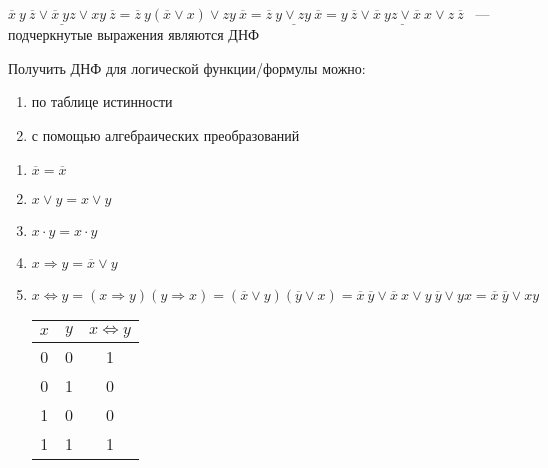 \documentclass[russian]{lecture-notes}
\begin{document}
\begin{sloppypar}
        \begin{example}
            $\underline{\overline{x} \: y \: \overline{z} \lor \overline{x} \: yz \lor xy \: \overline{z}} = \overline{z} \: y (\overline{x} \lor x) \lor zy \: \overline{x} = \underline{\overline{z} \: y \lor zy \: \overline{x}} = \underline{y \: \overline{z} \lor \overline{x} \: yz \lor \overline{x} \: x \lor z \: \overline{z}}$ ~--- подчеркнутые выражения являются ДНФ
        \end{example}

        Получить ДНФ для логической функции/формулы можно:
        \begin{enumerate}
            \item по таблице истинности
            \item с помощью алгебраических преобразований
        \end{enumerate}

        \begin{example}
            \begin{enumerate}
                \item $\overline{x} = \overline{x}$
                \item $x \lor y = x \lor y$
                \item $x \cdot y = x \cdot y$
                \item $x \Rightarrow y = \overline{x} \lor y$
                \item $x \Leftrightarrow y = (x \Rightarrow y)(y \Rightarrow x) = (\overline{x} \lor y)(\overline{y} \lor x) = \overline{x} \: \overline{y} \lor \overline{x} \: x \lor y \: \overline{y} \lor yx = \overline{x} \: \overline{y} \lor xy $

                \begin{table}[h!]
                    \centering
                    \begin{tabular}{|c|c|c|}
                        \hline
                        $x$ & $y$ & $x \Leftrightarrow y$ \\ \hline
                        0       & 0   & 1                     \\ \hline
                        0       & 1   & 0                     \\ \hline
                        1       & 0   & 0                     \\ \hline
                        1       & 1   & 1                     \\ \hline
                    \end{tabular}
                \end{table}


\end{enumerate}
\end{example}
\end{sloppypar}
\end{document}
